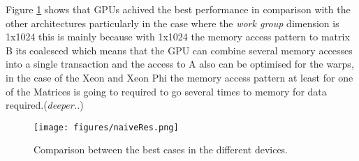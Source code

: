 \par{Figure \ref{NaiveRes} shows that GPUs achived the best performance in comparison with the other architectures particularly
    in the case where the \emph{work group} dimension is 1x1024 this is mainly because with 1x1024 the memory access pattern to 
    matrix B its coalesced which means that the GPU can combine several memory accesses into a single transaction and the access to 
    A also can be optimised for the warps, in the case of the Xeon and Xeon Phi the memory access pattern at least for one of the 
    Matrices is going to required to go several times to memory for data required.(\emph{deeper..})}


\begin{figure}[!h]
    \centering
    \texttt{[image: figures/naiveRes.png]}
    \caption{Comparison between the best cases in the different devices.}
    \label{NaiveRes}
\end{figure}



